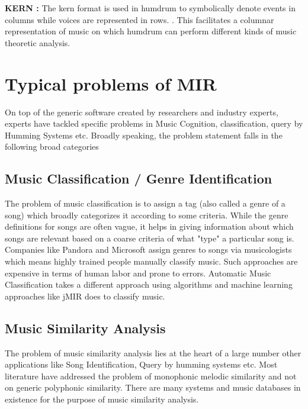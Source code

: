 \noindent \textbf{KERN :} The kern format \cite{humdrumkern} is used in humdrum to symbolically denote events in columns while voices are represented in rows. \cite{humdrum}. This facilitates a columnar representation of music on which humdrum can perform  different kinds of music theoretic analysis. 

\section{Typical problems of MIR}

\noindent On top of the generic software created by researchers and industry experts, experts have tackled specific problems in Music Cognition\cite{musiccog}, classification\cite{jMIR}, query by Humming Systems \cite{shazam} etc. Broadly speaking, the problem statement falls in the following broad categories

\subsection{Music Classification / Genre Identification}

\noindent The problem of music classification is to assign a tag (also called a genre of a song) which broadly categorizes it according to some criteria. While the genre definitions for songs are often vague, it helps in giving information about which songs are relevant based on a coarse criteria of what "type" a particular song is. Companies like Pandora and Microsoft assign genres to songs via musicologists \cite{genreclassification} which means highly trained people manually classify music. Such approaches are expensive in terms of human labor and prone to errors. Automatic Music Classification takes a different approach using algorithms and machine learning approaches like jMIR \cite{jMIR} does to classify music. 

\subsection{Music Similarity Analysis}

\noindent The problem of music similarity analysis lies at the heart of a large number other applications like Song Identification, Query by humming systems etc. Most literature have addressed the problem of monophonic melodic similarity \cite{simsurvey} and not on generic polyphonic similarity. There are many systems \cite{similie} and music databases in existence \cite{humdrumkern} for the purpose of music similarity analysis.

